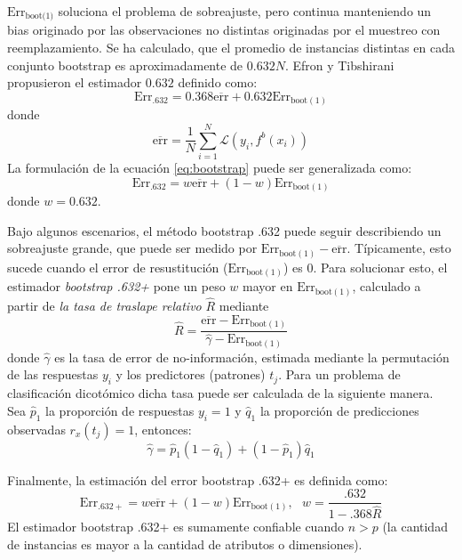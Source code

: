 \documentclass{article}
\begin{document}
$\text{Err}_{\text{boot(1)}}$ soluciona el problema de sobreajuste, pero continua manteniendo un bias originado por las observaciones no distintas originadas por el muestreo con reemplazamiento.
Se ha calculado, que el promedio de instancias distintas en cada conjunto bootstrap es aproximadamente de $0.632N$.
Efron y Tibshirani propusieron el estimador $0.632$ definido como:
\begin{equation}
	\text{Err}_{.632} = 0.368 \overline{\text{err}} + 0.632 \text{Err}_{\text{boot}(1)}
	\label{eq:bootstrap}
\end{equation}
donde
$$
\overline{\text{err}} = \frac{1}{N} \sum_{i=1}^{N} \mathcal{L}(y_i,f^b(x_i))
$$
La formulación de la ecuación \ref{eq:bootstrap} puede ser generalizada como:
\begin{equation}
	\text{Err}_{.632} = w \overline{\text{err}} + (1 - w) \text{Err}_{\text{boot}(1)}
\end{equation}
donde $w=0.632$.


Bajo algunos escenarios, el método bootstrap .632 puede seguir describiendo un sobreajuste grande, que puede ser medido por $\text{Err}_{\text{boot}(1)} - \overline{\text{err}}$.
Típicamente, esto sucede cuando el error de resustitución ($\text{Err}_{\text{boot}(1)}$) es $0$.
Para solucionar esto, el estimador \emph{bootstrap .632+} pone un peso $w$ mayor en $\text{Err}_{\text{boot}(1)}$, calculado a partir de \emph{la tasa de traslape relativo} $\hat{R}$ mediante
$$
\hat{R} = \frac{\overline{\text{err}} - \text{Err}_{\text{boot}(1)}}{\hat{\gamma} - \text{Err}_{\text{boot}(1)}}
$$
donde $\hat{\gamma}$ es la tasa de error de no-información, estimada mediante la permutación de las respuestas $y_i$ y los predictores (patrones) $t_j$.
Para un problema de clasificación dicotómico dicha tasa puede ser calculada de la siguiente manera.
Sea $\hat{p}_1$ la proporción de respuestas $y_i = 1$  y $\hat{q}_1$ la proporción de predicciones observadas $r_x(t_j) = 1$, entonces:
\begin{equation}
	\hat{\gamma} = \hat{p}_1(1-\hat{q}_1) + (1-\hat{p}_1) \hat{q}_1
\end{equation}

Finalmente, la estimación del error bootstrap .632+ es definida como:
\begin{equation}
	\text{Err}_{.632+} = w \overline{\text{err}} + (1 - w) \text{Err}_{\text{boot}(1)}, \text{ } w = \frac{.632}{1-.368\hat{R}}
\end{equation}
El estimador bootstrap .632+ es sumamente confiable cuando $n>p$ (la cantidad de instancias es mayor a la cantidad de atributos o dimensiones).
\end{document}
